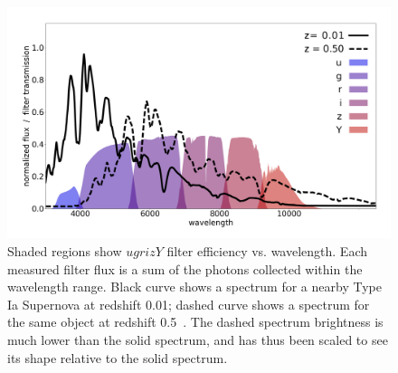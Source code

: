 \begin{figure}
\includegraphics[width=\textwidth]{figures/spec_filters.png}
\caption{Shaded regions show $ugrizY$ filter efficiency vs. wavelength.
Each measured filter flux is a sum of the photons collected within the wavelength range.
Black curve shows a spectrum for a nearby Type Ia Supernova at redshift 0.01;
dashed curve shows a spectrum for the same object at redshift 0.5~.
The dashed spectrum {brightness is much lower than the solid spectrum, and has thus been scaled} to see its shape relative
to the solid spectrum.}
\label{fig:filters}
\end{figure}









